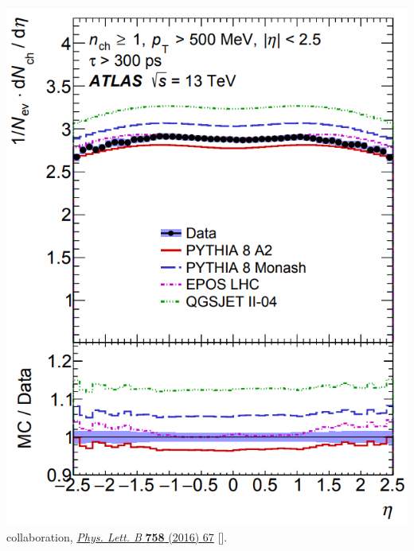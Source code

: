 \documentclass[9pt,a4paper,unknownkeysallowed,xcolor=dvipsnames,aspectratio=43]{beamer}
\begin{document}
%
%
\begin{frame}
\vspace{2mm}

\begin{columns}
\begin{column}{0.5\textwidth}
\begin{center}
\includegraphics[width=\textwidth]{01/multiplicity.png}\\
    {\tiny \color{teablue}{\scshape ATLAS} collaboration, %
    \href{https://doi.org/10.1016/j.physletb.2016.04.050}{\emph{Phys.
  Lett. B} {\bfseries 758} (2016) 67}
  [\href{https://arxiv.org/abs/1602.01633}{{}}].
}
\end{center}
\end{column}


\end{columns}
\end{frame}
\end{document}
